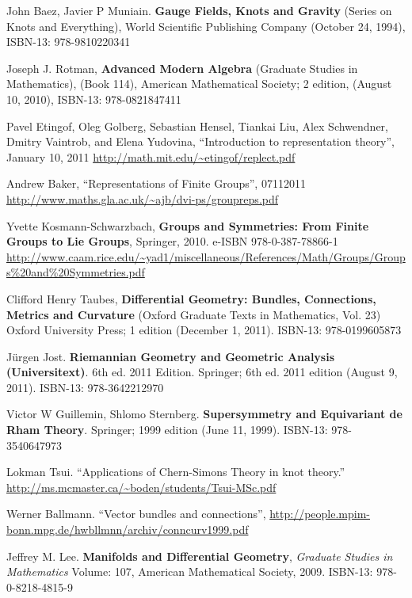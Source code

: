 \documentclass[10pt]{amsart}
\begin{document}
\begin{thebibliography}{9}

John Baez, Javier P Muniain.  \textbf{Gauge Fields, Knots and Gravity} (Series on Knots and Everything), World Scientific Publishing Company (October 24, 1994), ISBN-13: 978-9810220341

Joseph J. Rotman, \textbf{Advanced Modern Algebra} (Graduate Studies in Mathematics), (Book 114), American Mathematical Society; 2 edition, (August 10, 2010), ISBN-13: 978-0821847411

Pavel Etingof, Oleg Golberg, Sebastian Hensel, Tiankai Liu, Alex Schwendner, Dmitry Vaintrob, and Elena Yudovina, ``Introduction to representation theory'', January 10, 2011
\url{http://math.mit.edu/~etingof/replect.pdf}

Andrew Baker, ``Representations of Finite Groups'', 07112011
\url{http://www.maths.gla.ac.uk/~ajb/dvi-ps/groupreps.pdf}

Yvette Kosmann-Schwarzbach, \textbf{Groups and Symmetries: From Finite Groups to Lie Groups}, Springer, 2010. e-ISBN 978-0-387-78866-1 \url{http://www.caam.rice.edu/~yad1/miscellaneous/References/Math/Groups/Groups\%20and\%20Symmetries.pdf}

Clifford Henry Taubes, \textbf{Differential Geometry: Bundles, Connections, Metrics and Curvature} (Oxford Graduate Texts in Mathematics, Vol. 23) Oxford University Press; 1 edition (December 1, 2011). ISBN-13: 978-0199605873

J\"{u}rgen Jost. \textbf{Riemannian Geometry and Geometric Analysis (Universitext)}. 6th ed. 2011 Edition.  Springer; 6th ed. 2011 edition (August 9, 2011).  ISBN-13: 978-3642212970

Victor W Guillemin, Shlomo Sternberg.  \textbf{Supersymmetry and Equivariant de Rham Theory}.  Springer; 1999 edition (June 11, 1999).  ISBN-13: 978-3540647973


Lokman Tsui.  ``Applications of Chern-Simons Theory in knot theory.'' \url{http://ms.mcmaster.ca/~boden/students/Tsui-MSc.pdf}

Werner Ballmann. ``Vector bundles and connections'', \url{http://people.mpim-bonn.mpg.de/hwbllmnn/archiv/conncurv1999.pdf}

Jeffrey M. Lee. \textbf{Manifolds and Differential Geometry}, \emph{Graduate Studies in Mathematics} Volume: 107, American Mathematical Society, 2009. ISBN-13: 978-0-8218-4815-9



\end{thebibliography}
\end{document}
